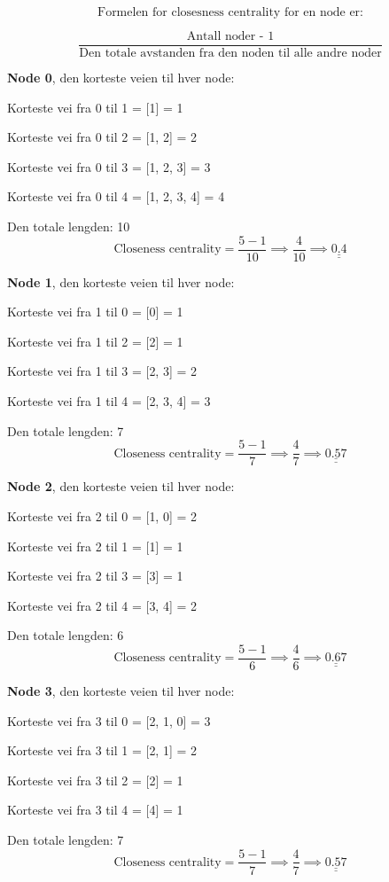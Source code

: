 \documentclass[11pt]{article}
\begin{document}
\[\text{Formelen for closesness centrality for en node er:}\]

\[\frac{\text{Antall noder - 1}}{\text{Den totale avstanden fra den noden til alle andre noder}}\]

\textbf{Node 0}, den korteste veien til hver node:

Korteste vei fra 0 til 1 = {[}1{]} = 1

Korteste vei fra 0 til 2 = {[}1, 2{]} = 2

Korteste vei fra 0 til 3 = {[}1, 2, 3{]} = 3

Korteste vei fra 0 til 4 = {[}1, 2, 3, 4{]} = 4

Den totale lengden: 10
\[\text{Closeness centrality} = \frac{5 - 1}{10} \implies \frac{4}{10} \implies\underline{\underline{ 0.4 }}\]

\textbf{Node 1}, den korteste veien til hver node:

Korteste vei fra 1 til 0 = {[}0{]} = 1

Korteste vei fra 1 til 2 = {[}2{]} = 1

Korteste vei fra 1 til 3 = {[}2, 3{]} = 2

Korteste vei fra 1 til 4 = {[}2, 3, 4{]} = 3

Den totale lengden: 7
\[\text{Closeness centrality} = \frac{5 - 1}{7} \implies \frac{4}{7} \implies\underline{\underline{ 0.57 }}\]

\textbf{Node 2}, den korteste veien til hver node:

Korteste vei fra 2 til 0 = {[}1, 0{]} = 2

Korteste vei fra 2 til 1 = {[}1{]} = 1

Korteste vei fra 2 til 3 = {[}3{]} = 1

Korteste vei fra 2 til 4 = {[}3, 4{]} = 2

Den totale lengden: 6
\[\text{Closeness centrality} = \frac{5 - 1}{6} \implies \frac{4}{6} \implies\underline{\underline{ 0.67 }}\]

\textbf{Node 3}, den korteste veien til hver node:

Korteste vei fra 3 til 0 = {[}2, 1, 0{]} = 3

Korteste vei fra 3 til 1 = {[}2, 1{]} = 2

Korteste vei fra 3 til 2 = {[}2{]} = 1

Korteste vei fra 3 til 4 = {[}4{]} = 1

Den totale lengden: 7
\[\text{Closeness centrality} = \frac{5 - 1}{7} \implies \frac{4}{7} \implies\underline{\underline{ 0.57 }}\]
\end{document}
